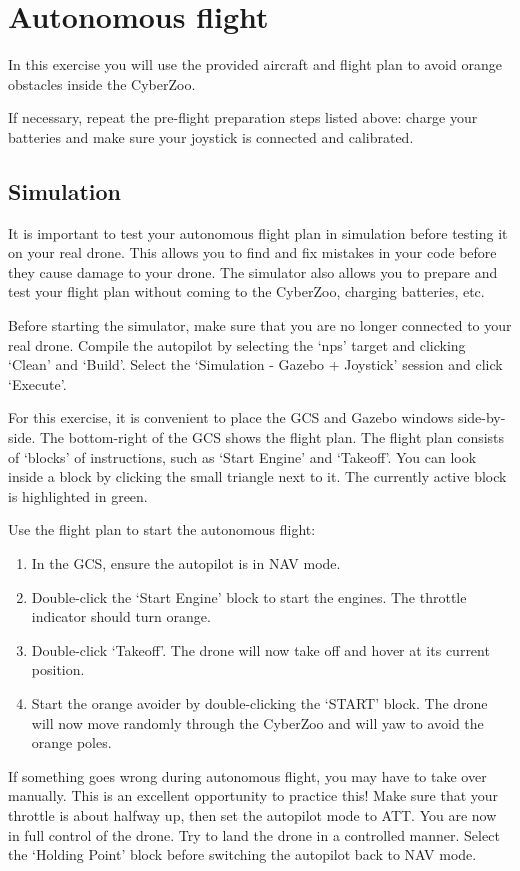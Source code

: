 \documentclass{article}
\begin{document}
\section*{Autonomous flight}
In this exercise you will use the provided aircraft and flight plan to avoid orange obstacles inside the CyberZoo.

\medskip
If necessary, repeat the pre-flight preparation steps listed above: charge your batteries and make sure your joystick is connected and calibrated.

\subsection*{Simulation}
It is important to test your autonomous flight plan in simulation before testing it on your real drone. This allows you to find and fix mistakes in your code before they cause damage to your drone. The simulator also allows you to prepare and test your flight plan without coming to the CyberZoo, charging batteries, etc.

\medskip
Before starting the simulator, make sure that you are no longer connected to your real drone.
Compile the autopilot by selecting the `nps' target and clicking `Clean' and `Build'. Select the `Simulation - Gazebo + Joystick' session and click `Execute'.

\medskip
For this exercise, it is convenient to place the GCS and Gazebo windows side-by-side.
The bottom-right of the GCS shows the flight plan. The flight plan consists of `blocks' of instructions, such as `Start Engine' and `Takeoff'. You can look inside a block by clicking the small triangle next to it. The currently active block is highlighted in green.

Use the flight plan to start the autonomous flight:
\begin{enumerate}
\item In the GCS, ensure the autopilot is in NAV mode.
\item Double-click the `Start Engine' block to start the engines. The throttle indicator should turn orange.
\item Double-click `Takeoff'. The drone will now take off and hover at its current position.
\item Start the orange avoider by double-clicking the `START' block. The drone will now move randomly through the CyberZoo and will yaw to avoid the orange poles.
\end{enumerate}

\medskip
If something goes wrong during autonomous flight, you may have to take over manually. This is an excellent opportunity to practice this!
Make sure that your throttle is about halfway up, then set the autopilot mode to ATT. You are now in full control of the drone. Try to land the drone in a controlled manner. Select the `Holding Point' block before switching the autopilot back to NAV mode.
\end{document}
